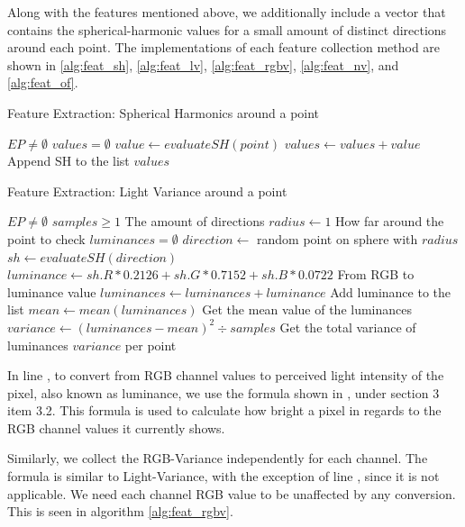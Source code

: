Along with the features mentioned above, we additionally include a vector that contains the spherical-harmonic values for a small amount of distinct directions around each point. The implementations of each feature collection method are shown in \ref{alg:feat_sh}, \ref{alg:feat_lv}, \ref{alg:feat_rgbv}, \ref{alg:feat_nv}, and \ref{alg:feat_of}.


\begin{algorithm}
	\caption{Feature Extraction: Spherical Harmonics around a point}
	\label{alg:feat_sh}
	\begin{algorithmic}[1]
		\Require $EP \neq \emptyset$
		\State $values = \emptyset$
			\State $value \gets evaluateSH(point)$
			\State $values \gets values + value$ \Comment Append SH to the list
		\EndFor
		\State \Return $values$
	\end{algorithmic}
\end{algorithm}

\begin{algorithm}
	\caption{Feature Extraction: Light Variance around a point}
	\label{alg:feat_lv}
	\begin{algorithmic}[1]
		\Require $EP \neq \emptyset$
		\Require $samples \geq 1$ \Comment The amount of directions
		\State $radius \gets 1$ \Comment How far around the point to check
			\State $luminances = \emptyset$
				\State $direction \gets$ random point on sphere with $radius$
				\State $sh \gets evaluateSH(direction)$
				\State $luminance \gets sh.R * 0.2126 + sh.G * 0.7152 + sh.B * 0.0722$ \Comment From RGB to luminance value
				\label{alg:feat_lv:7}
				\State $luminances \gets luminances + luminance$ \Comment Add luminance to the list
			\EndFor
			\State $mean \gets mean(luminances)$ \Comment Get the mean value of the luminances
			\State $variance \gets (luminances - mean)^2 \div samples$ \Comment Get the total variance of luminances
		\EndFor
		\State \Return $variance$ per point
	\end{algorithmic}
\end{algorithm}

In line , to convert from RGB channel values to perceived light intensity of the pixel, also known as luminance, we use the formula shown in \cite{Luminance2015}, under section 3 item 3.2. This formula is used to calculate how bright a pixel in regards to the RGB channel values it currently shows.

Similarly, we collect the RGB-Variance independently for each channel. The formula is similar to Light-Variance, with the exception of line , since it is not applicable. We need each channel RGB value to be unaffected by any conversion. This is seen in algorithm \ref{alg:feat_rgbv}.

